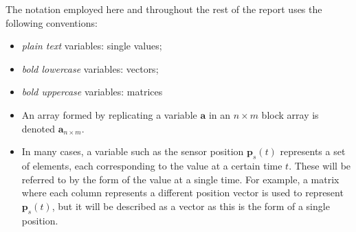 The notation employed here and throughout the rest of the report uses the following conventions:
\begin{itemize} \setlength\itemsep{-2mm}
\item \textit{plain text} variables: single values;
\item \textit{bold lowercase} variables: vectors;
\item \textit{bold uppercase} variables: matrices
\item An array formed by replicating a variable $\mathbf{a}$ in an $n \times m$ block array is denoted $\mathbf{a}_{n \times m}$.
\item In many cases, a variable such as the sensor position $\mathbf{p}_s(t)$ represents a set of elements, each corresponding to the value at a certain time $t$. These will be referred to by the form of the value at a single time. For example, a matrix where each column represents a different position vector is used to represent $\mathbf{p}_s(t)$, but it will be described as a vector as this is the form of a single position.
\end{itemize}

